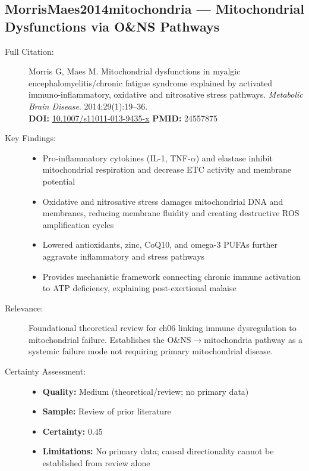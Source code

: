 
\subsection*{MorrisMaes2014mitochondria --- Mitochondrial Dysfunctions via O\&NS Pathways}
\begin{description}
    \item[Full Citation:] Morris G, Maes M. Mitochondrial dysfunctions in myalgic encephalomyelitis/chronic fatigue syndrome explained by activated immuno-inflammatory, oxidative and nitrosative stress pathways. \textit{Metabolic Brain Disease}. 2014;29(1):19--36.\\
    \textbf{DOI:} \href{https://doi.org/10.1007/s11011-013-9435-x}{10.1007/s11011-013-9435-x} \quad \textbf{PMID:} 24557875
    \item[Key Findings:]
    \begin{itemize}
        \item Pro-inflammatory cytokines (IL-1, TNF-\(\alpha\)) and elastase inhibit mitochondrial respiration and decrease ETC activity and membrane potential
        \item Oxidative and nitrosative stress damages mitochondrial DNA and membranes, reducing membrane fluidity and creating destructive ROS amplification cycles
        \item Lowered antioxidants, zinc, CoQ10, and omega-3 PUFAs further aggravate inflammatory and stress pathways
        \item Provides mechanistic framework connecting chronic immune activation to ATP deficiency, explaining post-exertional malaise
    \end{itemize}
    \item[Relevance:] Foundational theoretical review for ch06 linking immune dysregulation to mitochondrial failure. Establishes the O\&NS$\rightarrow$mitochondria pathway as a systemic failure mode not requiring primary mitochondrial disease.
    \item[Certainty Assessment:]
    \begin{itemize}
        \item \textbf{Quality:} Medium (theoretical/review; no primary data)
        \item \textbf{Sample:} Review of prior literature
        \item \textbf{Certainty:} 0.45
        \item \textbf{Limitations:} No primary data; causal directionality cannot be established from review alone
    \end{itemize}
\end{description}

